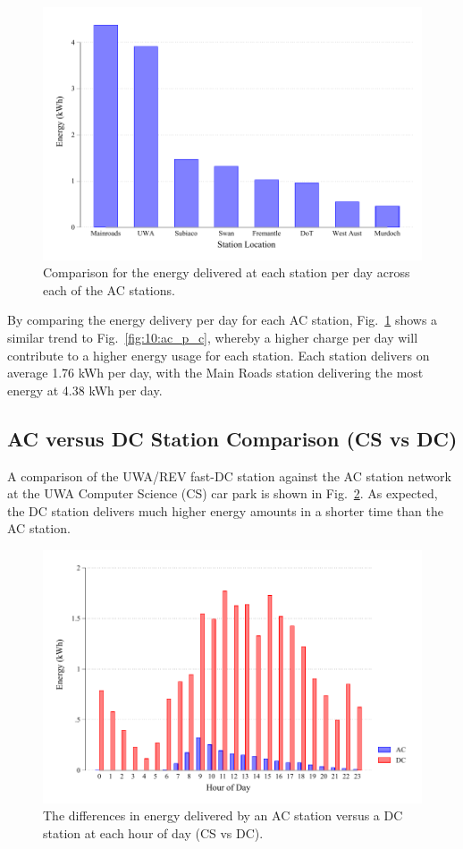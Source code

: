 \begin{figure}[H]
	\centering
	\includegraphics[width=0.8\linewidth]{ac_p_e}
	\caption[Energy delivered at each AC station per day]{Comparison for the energy delivered at each station per day across each of the AC stations.}
	\label{fig:10:ac_p_e}
\end{figure}

By comparing the energy delivery per day for each AC station, Fig.~\ref{fig:10:ac_p_e} shows a similar trend to Fig.~\ref{fig:10:ac_p_c}, whereby a higher charge per day will contribute to a higher energy usage for each station. Each station delivers on average 1.76 kWh per day, with the Main Roads station delivering the most energy at 4.38 kWh per day.

\subsection{AC versus DC Station Comparison (CS vs DC)}
A comparison of the UWA/REV fast-DC station against the AC station network at the UWA Computer Science (CS) car park is shown in Fig.~\ref{fig:10:acdc_e}. As expected, the DC station delivers much higher energy amounts in a shorter time than the AC station. 

\begin{figure}[H]
	\centering
	\includegraphics[width=0.8\linewidth]{acdc_e}
	\caption[Energy delivered by an AC station versus a DC station]{The differences in energy delivered by an AC station versus a DC station at each hour of day (CS vs DC).}
	\label{fig:10:acdc_e}
\end{figure}

